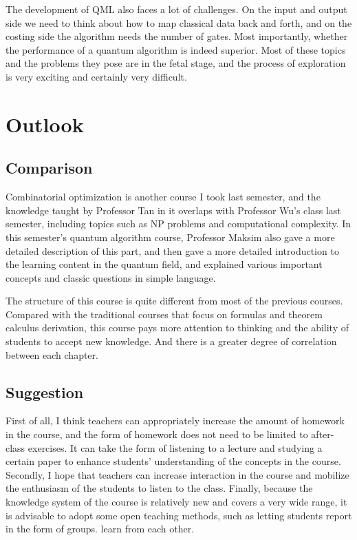 \documentclass[11pt]{article}
\begin{document}
The development of QML also faces a lot of challenges. On the input and output side we need to think about how to map classical data back and forth, and on the costing side the algorithm needs the number of gates. Most importantly, whether the performance of a quantum algorithm is indeed superior. Most of these topics and the problems they pose are in the fetal stage, and the process of exploration is very exciting and certainly very difficult.

\section{Outlook}
\subsection{Comparison}
\qquad Combinatorial optimization is another course I took last semester, and the knowledge taught by Professor Tan in it overlaps with Professor Wu's class last semester, including topics such as NP problems and computational complexity. In this semester's quantum algorithm course, Professor Maksim also gave a more detailed description of this part, and then gave a more detailed introduction to the learning content in the quantum field, and explained various important concepts and classic questions in simple language.

The structure of this course is quite different from most of the previous courses. Compared with the traditional courses that focus on formulas and theorem calculus derivation, this course pays more attention to thinking and the ability of students to accept new knowledge. And there is a greater degree of correlation between each chapter.
\subsection{Suggestion}
\qquad First of all, I think teachers can appropriately increase the amount of homework in the course, and the form of homework does not need to be limited to after-class exercises. It can take the form of listening to a lecture and studying a certain paper to enhance students' understanding of the concepts in the course. Secondly, I hope that teachers can increase interaction in the course and mobilize the enthusiasm of the students to listen to the class. Finally, because the knowledge system of the course is relatively new and covers a very wide range, it is advisable to adopt some open teaching methods, such as letting students report in the form of groups. learn from each other.
\end{document}
